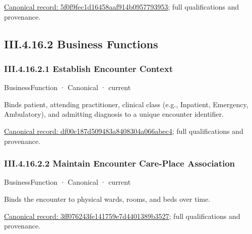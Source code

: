 {\footnotesize \href{../../../../continuum/business/business-service/5f0f9fec1d16458aaf914b0957793953.md}{Canonical record: 5f0f9fec1d16458aaf914b0957793953}; full qualifications and provenance.}\par
\subsection*{III.4.16.2 Business Functions}
\label{navigation:III.4.16.2}

\subsubsection*{III.4.16.2.1 Establish Encounter Context}
\label{navigation:III.4.16.2.1}

\label{element:df00c187d509483a8408304a066abec4}
{\small BusinessFunction · Canonical · current}\par

Binds patient, attending practitioner, clinical class (e.g., Inpatient, Emergency, Ambulatory), and admitting diagnosis to a unique encounter identifier.


{\footnotesize \href{../../../../continuum/business/business-function/df00c187d509483a8408304a066abec4.md}{Canonical record: df00c187d509483a8408304a066abec4}; full qualifications and provenance.}\par
\subsubsection*{III.4.16.2.2 Maintain Encounter Care-Place Association}
\label{navigation:III.4.16.2.2}

\label{element:3ff076243fe141759e7d4401389b3527}
{\small BusinessFunction · Canonical · current}\par

Binds the encounter to physical wards, rooms, and beds over time.


{\footnotesize \href{../../../../continuum/business/business-function/3ff076243fe141759e7d4401389b3527.md}{Canonical record: 3ff076243fe141759e7d4401389b3527}; full qualifications and provenance.}\par
